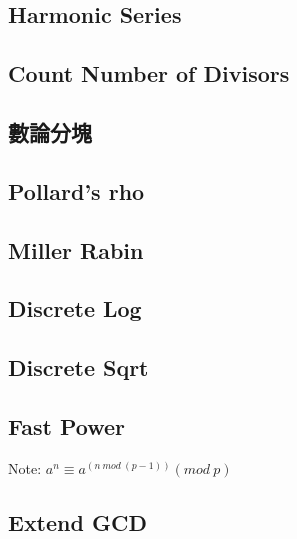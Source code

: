 \documentclass[a4paper,10pt,twocolumn,oneside]{article}
\begin{document}
\subsection{Harmonic Series}


\subsection{Count Number of Divisors}


\subsection{數論分塊}



\subsection{Pollard's rho}



\subsection{Miller Rabin}


\subsection{Discrete Log}


\subsection{Discrete Sqrt}


\subsection{Fast Power}
{ \normalsize
Note: $a^n \equiv a^{(n \ mod \ (p-1))} (mod \ p)$
}

\subsection{Extend GCD}

\end{document}
